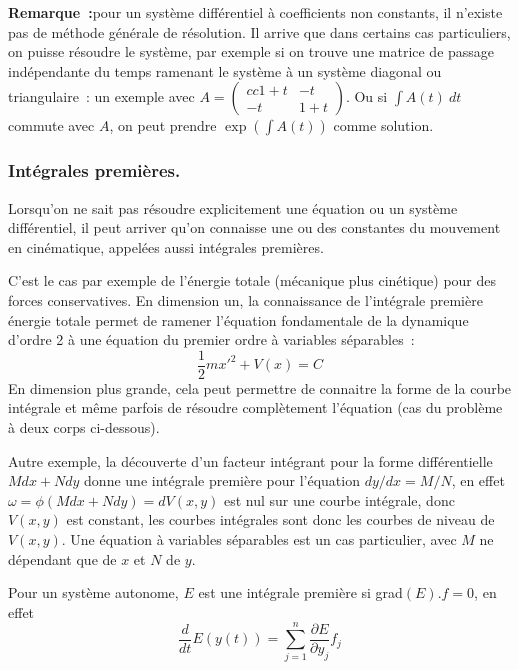 \documentclass[a4paper,11pt]{article}
\begin{document}
{\bf Remarque~:}pour un syst\`eme diff\'erentiel \`a coefficients
non constants, il n'existe pas de m\'ethode g\'en\'erale de
r\'esolution. Il arrive que dans certains cas particuliers,
on puisse r\'esoudre le syst\`eme, par exemple si on trouve
une matrice de passage ind\'ependante du temps ramenant
le syst\`eme \`a un syst\`eme diagonal ou triangulaire~:
un exemple avec
$A=\left(\begin{matrix}{cc} 1+t & -t \\ -t & 1+t\end{matrix}\right)$.
Ou si $\int A(t) \ dt$ commute avec $A$, on peut prendre 
$\exp(\int A(t))$ comme solution.

\subsubsection{Int\'egrales premi\`eres.}
Lorsqu'on ne sait pas r\'esoudre explicitement une \'equation
ou un syst\`eme diff\'erentiel, il peut arriver qu'on connaisse
une ou des constantes du mouvement en cin\'ematique, appel\'ees
aussi int\'egrales premi\`eres. 

C'est le cas par exemple de
l'\'energie totale (m\'ecanique plus cin\'etique) pour des forces
conservatives.  En dimension un, la connaissance de l'int\'egrale 
premi\`ere \'energie
totale permet de ramener l'\'equation fondamentale de la
dynamique d'ordre 2 \`a une \'equation
du premier ordre \`a variables s\'eparables~:
$$ \frac12 m x'^2+ V(x) = C $$
En dimension plus grande, cela peut permettre de 
connaitre la forme de la courbe int\'egrale et m\^eme
parfois de r\'esoudre compl\`etement l'\'equation (cas du probl\`eme
\`a deux corps ci-dessous).
 
Autre exemple, la d\'ecouverte d'un facteur 
int\'egrant pour la forme diff\'erentielle $Mdx+Ndy$
donne une int\'egrale premi\`ere pour l'\'equation $dy/dx=M/N$,
en effet $\omega=\phi(Mdx+Ndy)=dV(x,y)$ est nul
sur une courbe int\'egrale, donc $V(x,y)$
est constant, les courbes int\'egrales sont donc 
les courbes de niveau de $V(x,y)$. Une \'equation \`a variables
s\'eparables est un cas particulier, avec $M$ ne d\'ependant que de
$x$ et $N$ de $y$.

Pour un syst\`eme autonome, $E$ est une int\'egrale premi\`ere si
grad$(E).f=0$, en effet
$$ \frac{d}{dt} E(y(t))= \sum_{j=1}^n \frac{\partial E}{\partial y_j} f_j$$
\end{document}
